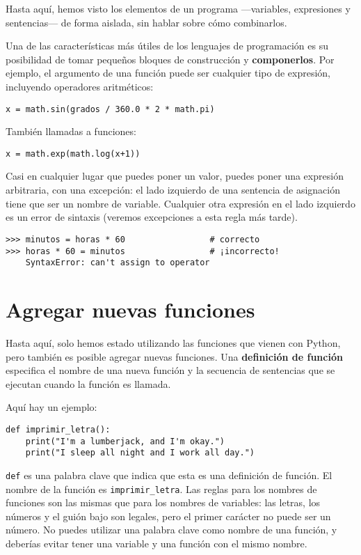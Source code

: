 \documentclass[10pt]{book}
\begin{document}
Hasta aquí, hemos visto los elementos de un programa ---variables,
expresiones y sentencias--- de forma aislada, sin hablar sobre cómo
combinarlos.

Una de las características más útiles de los lenguajes de programación es su
posibilidad de tomar pequeños bloques de construcción y {\bf componerlos}.  Por
ejemplo, el argumento de una función puede ser cualquier tipo de expresión,
incluyendo operadores aritméticos:

\begin{verbatim}
x = math.sin(grados / 360.0 * 2 * math.pi)
\end{verbatim}
%
También llamadas a funciones:

\begin{verbatim}
x = math.exp(math.log(x+1))
\end{verbatim}
%
Casi en cualquier lugar que puedes poner un valor, puedes poner una expresión
arbitraria, con una excepción: el lado izquierdo de una sentencia
de asignación tiene que ser un nombre de variable. Cualquier otra expresión en el lado
izquierdo es un error de sintaxis (veremos excepciones a esta regla
más tarde).

\begin{verbatim}
>>> minutos = horas * 60                 # correcto
>>> horas * 60 = minutos                 # ¡incorrecto!
    SyntaxError: can't assign to operator
\end{verbatim}
%


\section{Agregar nuevas funciones}

Hasta aquí, solo hemos estado utilizando las funciones que vienen con Python,
pero también es posible agregar nuevas funciones.
Una {\bf definición de función} especifica el nombre de una nueva función y
la secuencia de sentencias que se ejecutan cuando la función es llamada.

Aquí hay un ejemplo:

\begin{verbatim}
def imprimir_letra():
    print("I'm a lumberjack, and I'm okay.")
    print("I sleep all night and I work all day.")
\end{verbatim}
%
{\tt def} es una palabra clave que indica que esta es una definición
de función. El nombre de la función es \verb"imprimir_letra".  Las
reglas para los nombres de funciones son las mismas que para los nombres de variables: las letras,
los números y el guión bajo son legales, pero el primer carácter
no puede ser un número.  No puedes utilizar una palabra clave como nombre de una función,
y deberías evitar tener una variable y una función con el mismo
nombre.
\end{document}

